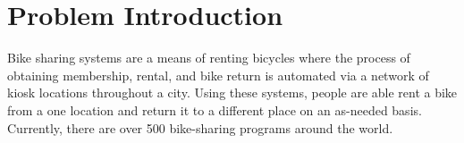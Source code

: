 \section{Problem Introduction}\label{sec-intro}











Bike sharing systems are a means of renting bicycles where the process of obtaining membership,
rental, and bike return is automated via a network of kiosk locations throughout a city.
Using these systems, people are able rent a bike from a one location and return it to a different place on an as-needed basis.
Currently, there are over 500 bike-sharing programs around the world.




